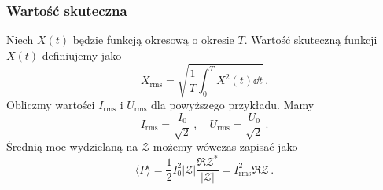 \documentclass[../main.tex]{subfiles}
\begin{document}
\subsubsection*{Wartość skuteczna}
Niech \(X(t)\) będzie funkcją okresową o okresie \(T\). Wartość skuteczną funkcji \(X(t)\) definiujemy jako
\begin{equation*}
    X_\text{rms}=\sqrt{\frac{1}{T}\int_0^{T}X^2(t)\dd{t}}\,.
\end{equation*}
Obliczmy wartości \(I_\text{rms}\) i \(U_\text{rms}\) dla powyższego przykładu. Mamy
\begin{equation*}
    I_\text{rms}=\frac{I_0}{\sqrt{2}}\,,\quad U_\text{rms}=\frac{U_0}{\sqrt{2}}\,.
\end{equation*}
Średnią moc wydzielaną na \(\mathcal{Z}\) możemy wówczas zapisać jako
\begin{equation*}
    \langle P\rangle=\frac{1}{2}I_0^2|\mathcal{Z}|\frac{\Re{\mathcal{Z}^*}}{|\mathcal{Z}|}=I_\text{rms}^2\Re{\mathcal{Z}}\,.
\end{equation*}
\end{document}
